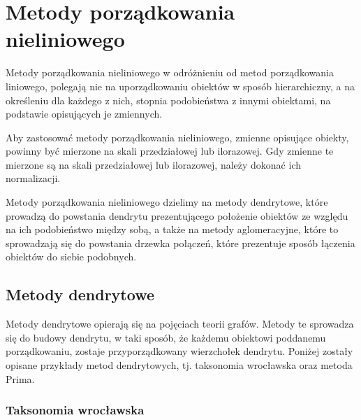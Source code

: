\documentclass[12pt,a4paper]{report}
\begin{document}
\section{Metody porządkowania nieliniowego}


Metody porządkowania nieliniowego w odróżnieniu od metod porządkowania liniowego, polegają nie na uporządkowaniu obiektów w sposób hierarchiczny, a na określeniu dla każdego z nich, stopnia podobieństwa z innymi obiektami, na podstawie opisujących je zmiennych. 

Aby zastosować metody porządkowania nieliniowego, zmienne opisujące obiekty, powinny być mierzone na skali przedziałowej lub ilorazowej. Gdy zmienne te mierzone są na skali przedziałowej lub ilorazowej, należy dokonać ich normalizacji.

Metody porządkowania nieliniowego dzielimy na metody dendrytowe, które prowadzą do powstania dendrytu prezentującego położenie obiektów ze względu na ich podobieństwo między sobą, a także na metody aglomeracyjne, które to sprowadzają się do powstania drzewka połączeń, które prezentuje sposób łączenia obiektów do siebie podobnych. 

\subsection{Metody dendrytowe}


Metody dendrytowe opierają się na pojęciach teorii grafów. Metody te sprowadza się do budowy dendrytu, w taki sposób, że każdemu obiektowi poddanemu porządkowaniu, zostaje przyporządkowany wierzchołek dendrytu. Poniżej zostały opisane przykłady metod dendrytowych, tj. taksonomia wrocławska oraz metoda Prima. 

\subsubsection{Taksonomia wrocławska}
\end{document}
